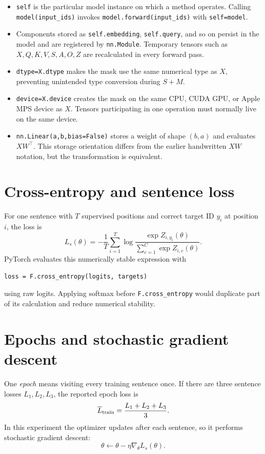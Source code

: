 \documentclass[11pt]{article}
\begin{document}
\begin{itemize}
\item \texttt{self} is the particular model instance on which a method operates. Calling
\texttt{model(input\_ids)} invokes \texttt{model.forward(input\_ids)} with \texttt{self=model}.
\item Components stored as \texttt{self.embedding}, \texttt{self.query}, and so on persist in the model and are
registered by \texttt{nn.Module}. Temporary tensors such as $X,Q,K,V,S,A,O,Z$ are recalculated in every forward
pass.
\item \texttt{dtype=X.dtype} makes the mask use the same numerical type as $X$, preventing unintended type
conversion during $S+M$.
\item \texttt{device=X.device} creates the mask on the same CPU, CUDA GPU, or Apple MPS device as $X$. Tensors
participating in one operation must normally live on the same device.
\item \texttt{nn.Linear(a,b,bias=False)} stores a weight of shape $(b,a)$ and evaluates $XW^\top$. This storage
orientation differs from the earlier handwritten $XW$ notation, but the transformation is equivalent.
\end{itemize}

\section{Cross-entropy and sentence loss}

For one sentence with $T$ supervised positions and correct target ID $y_i$ at position $i$, the loss is
\begin{equation}
L_s(\theta)=-\frac{1}{T}\sum_{i=1}^{T}\log
\frac{\exp Z_{i,y_i}(\theta)}{\sum_{c=1}^{C}\exp Z_{i,c}(\theta)}.
\end{equation}
PyTorch evaluates this numerically stable expression with
\begin{lstlisting}
loss = F.cross_entropy(logits, targets)
\end{lstlisting}
using raw logits. Applying softmax before \texttt{F.cross\_entropy} would duplicate part of its calculation and
reduce numerical stability.

\section{Epochs and stochastic gradient descent}

One \emph{epoch} means visiting every training sentence once. If there are three sentence losses
$L_1,L_2,L_3$, the reported epoch loss is
\[
\overline{L}_{\rm train}=\frac{L_1+L_2+L_3}{3}.
\]
In this experiment the optimizer updates after each sentence, so it performs stochastic gradient descent:
\[
\theta\leftarrow\theta-\eta\nabla_\theta L_s(\theta).
\]
\end{document}
